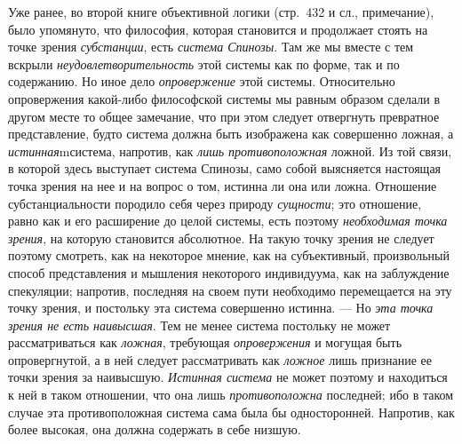 \documentclass[twoside]{article}
\begin{document}
{{Уже ранее, во второй книге объективной логики (стр.~432 и сл., примечание), 
было упомянуто, что философия, которая становится и продолжает стоять на 
точке зрения {\em субстанции}, есть {\em система Спинозы}. Там же мы вместе 
с тем вскрыли {\em неудовлетворительность} этой системы как по форме, так и 
по содержанию. Но иное дело {\em опровержение} этой системы. Относительно 
опровержения какой-либо философской системы мы равным образом сделали в 
другом месте то общее замечание, что при этом следует отвергнуть превратное 
представление, будто система должна быть изображена как совершенно ложная, 
а {\em истинная}mсистема, напротив, как {\em лишь противоположная} ложной. 
Из той связи, в которой здесь выступает система Спинозы, само собой 
выясняется настоящая точка зрения на нее и на вопрос о том, истинна ли она 
или ложна. Отношение субстанциальности породило себя через природу 
{\em сущности}; это отношение, равно как и его расширение до целой системы, 
есть поэтому {\em необходимая точка зрения}, на которую становится 
абсолютное. На такую точку зрения не следует поэтому смотреть, как на 
некоторое мнение, как на субъективный, произвольный способ представления и 
мышления некоторого индивидуума, как на заблуждение спекуляции; напротив, 
последняя на своем пути необходимо перемещается на эту точку зрения, и 
постольку эта система совершенно истинна. — Но {\em эта точка зрения не есть 
наивысшая}. Тем не менее система постольку не может рассматриваться как
{\em ложная}, требующая {\em опровержения} и могущая быть опровергнутой, а в 
ней следует рассматривать как {\em ложное} лишь признание ее точки зрения за 
наивысшую. {\em Истинная система} не может поэтому и находиться к ней в 
таком отношении, что она лишь {\em противоположна} последней; ибо в таком 
случае эта противоположная система сама была бы односторонней. Напротив, как 
более высокая, она должна содержать в себе низшую.

}}
\end{document}
